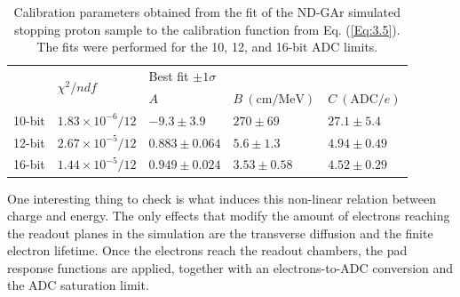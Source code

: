\begin{table}[t]
	\caption[Calibration parameters obtained from the fit of the ND-GAr simulated stopping proton sample to the calibration function, for different ADC limits.]{Calibration parameters obtained from the fit of the ND-GAr simulated stopping proton sample to the calibration function from Eq. (\ref{Eq:3.5}). The fits were performed for the 10, 12, and 16-bit ADC limits.}
	\begin{center}
		\begin{small}
			\begin{tabular}{lllll}
				\cline{2-5}
											& \multirow{2}{*}{$\chi^{2}/ndf$} & \multicolumn{3}{l}{Best fit $\pm 1\sigma$}                              \\ \cline{3-5} 
											&                                 & $A$             & $B~(\mathrm{cm}/\mathrm{MeV})$ & $C~(\mathrm{ADC}/e)$ \\ \hline
				\multicolumn{1}{l|}{10-bit} & $1.83\times10^{-6}/12$          & $-9.3\pm3.9$    & $270\pm69$                     & $27.1\pm5.4$         \\ \hline
				\multicolumn{1}{l|}{12-bit} & $2.67\times10^{-5}/12$          & $0.883\pm0.064$ & $5.6\pm1.3$                    & $4.94\pm0.49$        \\ \hline
				\multicolumn{1}{l|}{16-bit} & $1.44\times10^{-5}/12$          & $0.949\pm0.024$ & $3.53\pm0.58$                  & $4.52\pm0.29$        \\ \hline
			\end{tabular}
		\end{small}
	\end{center}
	\label{tab:calibration_fits}
\end{table}

One interesting thing to check is what induces this non-linear relation between charge and energy. The only effects that modify the amount of electrons reaching the readout planes in the simulation are the transverse diffusion and the finite electron lifetime. Once the electrons reach the readout chambers, the pad response functions are applied, together with an electrons-to-ADC conversion and the ADC saturation limit.

